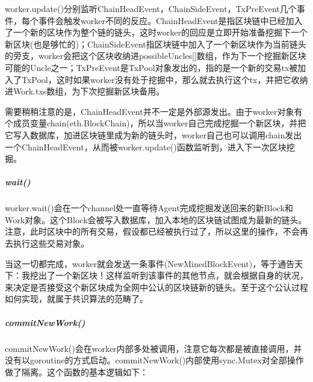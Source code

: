 \documentclass[UTF8]{ctexart}
\begin{document}
worker.update()分别监听ChainHeadEvent，ChainSideEvent，TxPreEvent几个事件，每个事件会触发worker不同的反应。ChainHeadEvent是指区块链中已经加入了一个新的区块作为整个链的链头，这时worker的回应是立即开始准备挖掘下一个新区块(也是够忙的)；ChainSideEvent指区块链中加入了一个新区块作为当前链头的旁支，worker会把这个区块收纳进possibleUncles[]数组，作为下一个挖掘新区块可能的Uncle之一；TxPreEvent是TxPool对象发出的，指的是一个新的交易tx被加入了TxPool，这时如果worker没有处于挖掘中，那么就去执行这个tx，并把它收纳进Work.txs数组，为下次挖掘新区块备用。

需要稍稍注意的是，ChainHeadEvent并不一定是外部源发出。由于worker对象有个成员变量chain(eth.BlockChain)，所以当worker自己完成挖掘一个新区块，并把它写入数据库，加进区块链里成为新的链头时，worker自己也可以调用chain发出一个ChainHeadEvent，从而被worker.update()函数监听到，进入下一次区块挖掘。

\subparagraph{wait()}

worker.wait()会在一个channel处一直等待Agent完成挖掘发送回来的新Block和Work对象。这个Block会被写入数据库，加入本地的区块链试图成为最新的链头。注意，此时区块中的所有交易，假设都已经被执行过了，所以这里的操作，不会再去执行这些交易对象。

当这一切都完成，worker就会发送一条事件(NewMinedBlockEvent{})，等于通告天下：我挖出了一个新区块！这样监听到该事件的其他节点，就会根据自身的状况，来决定是否接受这个新区块成为全网中公认的区块链新的链头。至于这个公认过程如何实现，就属于共识算法的范畴了。

\subparagraph{commitNewWork()}

commitNewWork()会在worker内部多处被调用，注意它每次都是被直接调用，并没有以goroutine的方式启动。commitNewWork()内部使用sync.Mutex对全部操作做了隔离。这个函数的基本逻辑如下：
\end{document}
